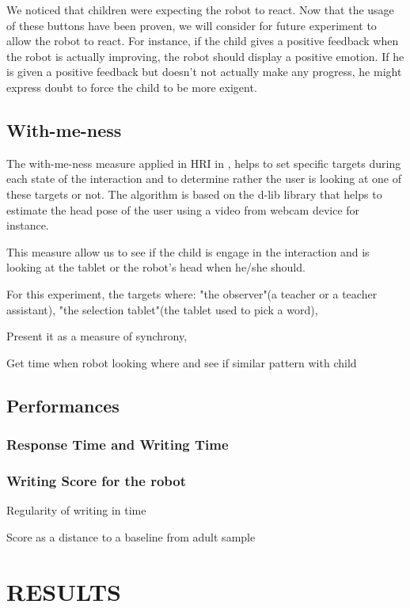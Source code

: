 \documentclass[letterpaper, 10 pt, conference]{ieeeconf}  %
\begin{document}
We noticed that children were expecting the robot to react. 
Now that the usage of these buttons have been proven, we will consider for future experiment to allow the robot to react. 
For instance, if the child gives a positive feedback when the robot is actually improving, the robot should display a positive emotion.
If he is given a positive feedback but doesn’t not actually make any progress, he might express doubt to force the child to be more exigent. 


\subsection{With-me-ness}
The with-me-ness measure applied in HRI in \cite{lemaignan2016realtime}, helps to set specific targets during each state of the interaction and to determine rather the user is looking at one of these targets or not. 
The algorithm is based on the d-lib library that helps to estimate the head pose of the user using a video from webcam device for instance.

This measure allow us to see if the child is engage in the interaction and is looking at the tablet or the robot's head when he/she should.

For this experiment, the targets where: "the observer"(a teacher or a teacher assistant), "the selection tablet"(the tablet used to pick a word), 

Present it as a measure of synchrony, 

Get time when robot looking where and see if similar pattern with child

\subsection{Performances}
\subsubsection{Response Time and Writing Time}

\subsubsection{Writing Score for the robot}
Regularity of writing in time

Score as a distance to a baseline from adult sample

\section{RESULTS}
\end{document}
